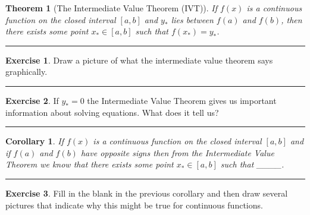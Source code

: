 \documentclass[
]{book}
\newtheorem{theorem}{Theorem}[chapter]
\newtheorem{corollary}{Corollary}[chapter]
\theoremstyle{definition}
\theoremstyle{definition}
\theoremstyle{definition}
\newtheorem{exercise}{Exercise}[chapter]
\theoremstyle{remark}
\begin{document}
\begin{theorem}[The Intermediate Value Theorem (IVT)]
\protect\hypertarget{thm:unnamed-chunk-71}{}{\label{thm:unnamed-chunk-71} {} }If \(f(x)\) is a continuous function on the closed interval \([a,b]\) and
\(y_*\) lies between \(f(a)\) and \(f(b)\), then there exists some point
\(x_* \in [a,b]\) such that \(f(x_*) = y_*\).
\end{theorem}

\begin{center}\rule{0.5\linewidth}{0.5pt}\end{center}

\begin{exercise}
\protect\hypertarget{exr:unnamed-chunk-72}{}{\label{exr:unnamed-chunk-72} }Draw a picture of what the intermediate value theorem says graphically.
\end{exercise}

\begin{center}\rule{0.5\linewidth}{0.5pt}\end{center}

\begin{exercise}
\protect\hypertarget{exr:unnamed-chunk-73}{}{\label{exr:unnamed-chunk-73} }If \(y_*=0\) the Intermediate Value Theorem gives us important information
about solving equations. What does it tell us?
\end{exercise}

\begin{center}\rule{0.5\linewidth}{0.5pt}\end{center}

\begin{corollary}
\protect\hypertarget{cor:unnamed-chunk-74}{}{\label{cor:unnamed-chunk-74} }If \(f(x)\) is a continuous function on the closed interval \([a,b]\) and if
\(f(a)\) and \(f(b)\) have opposite signs then from the Intermediate Value
Theorem we know that there exists some point \(x_* \in [a,b]\) such that \_\_\_\_.
\end{corollary}

\begin{center}\rule{0.5\linewidth}{0.5pt}\end{center}

\begin{exercise}
\protect\hypertarget{exr:unnamed-chunk-75}{}{\label{exr:unnamed-chunk-75} }Fill in the blank in the previous corollary and then draw several pictures that indicate why this might be true for continuous functions.
\end{exercise}
\end{document}
